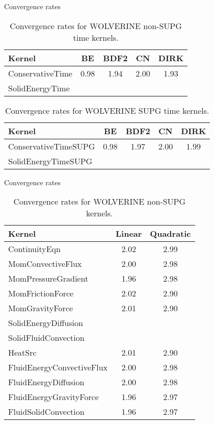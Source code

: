 \documentclass{beamer}
\begin{document}

\begin{frame}{Convergence rates}

\begin{table}[H]
\caption{Convergence rates for WOLVERINE non-SUPG time kernels.}
\centering
\begin{tabular}{l c c c c}
\hline\hline
Kernel  & BE & BDF2 & CN & DIRK\\ [0.5ex]
\hline
ConservativeTime 			 & 0.98 & 1.94 & 2.00 & 1.93\\
SolidEnergyTime 			 &  &  &  & \\
\hline
\end{tabular}
\end{table}

\begin{table}[H]
\caption{Convergence rates for WOLVERINE SUPG time kernels.}
\centering
\begin{tabular}{l c c c c}
\hline\hline
Kernel & BE & BDF2 & CN & DIRK\\ [0.5ex]
\hline
ConservativeTimeSUPG 			 & 0.98 & 1.97 & 2.00 & 1.99\\
SolidEnergyTimeSUPG 			 &  &  &  & \\
\hline
\end{tabular}
\end{table}

\end{frame}



\begin{frame}{Convergence rates}

\begin{table}[H]
\caption{Convergence rates for WOLVERINE non-SUPG kernels.}
\centering
\begin{tabular}{l c c}
\hline\hline
Kernel & Linear & Quadratic\\ [0.5ex]
\hline
ContinuityEqn 				 & 2.02	& 2.99\\
MomConvectiveFlux 			 & 2.00	& 2.98\\
MomPressureGradient 		 & 1.96 	& 2.98\\
MomFrictionForce 			 & 2.02	& 2.90\\
MomGravityForce 			 & 2.01	& 2.90\\
SolidEnergyDiffusion 		 & &\\
SolidFluidConvection 		 & &\\
HeatSrc 					 & 2.01 	& 2.90\\
FluidEnergyConvectiveFlux 	 & 2.00	& 2.98\\
FluidEnergyDiffusion 		 & 2.00 	& 2.98\\
FluidEnergyGravityForce 		 & 1.96	& 2.97\\
FluidSolidConvection 		 & 1.96 	& 2.97\\
\hline
\end{tabular}
\end{table}

\end{frame}
\end{document}
